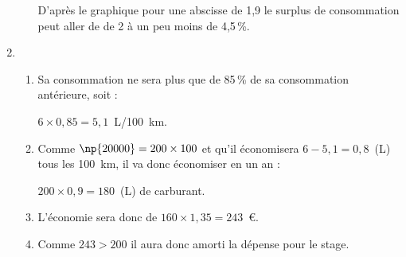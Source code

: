 \begin{enumerate}
\begin{enumerate}
%
D'après le graphique pour une abscisse de 1,9 le surplus de consommation peut aller de  de 2 à un peu moins de 4,5\,\%.
	\end{enumerate}
\item  %
	\begin{enumerate}
		\item %
		Sa consommation ne sera plus que de 85\,\% de sa consommation antérieure, soit :
		
$6 \times 0,85 = 5,1$~L/100~km.
		\item %
Comme $\np{20000} = 200 \times 100$ et qu'il économisera $6 - 5,1 = 0,8$~(L) tous les 100~km, il va donc économiser en un an :

$200 \times 0,9 = 180$~(L) de carburant.
		\item %
L'économie sera donc de $160 \times 1,35 = 243$~\euro.
		\item %
Comme $243 > 200$ il aura donc amorti la dépense pour le stage.
	\end{enumerate}
\end{enumerate}

\bigskip

